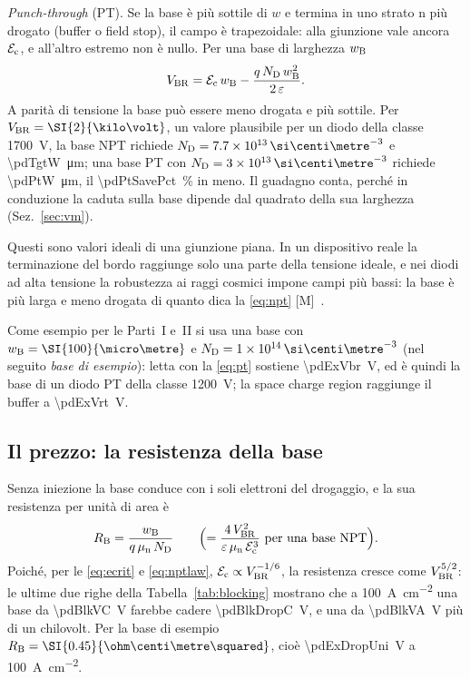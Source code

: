 \documentclass[10pt,a4paper]{scrartcl}
\let\newcommand\pdvaluedefine
\newcommand{\Ec}{\mathcal{E}_\mathrm{c}}      %
\newcommand{\ND}{N_\mathrm{D}}
\newcommand{\wB}{w_\mathrm{B}}
\newcommand{\mun}{\mu_\mathrm{n}}
\newcommand{\Vbr}{V_\mathrm{BR}}
\newcommand{\cmc}{\si{\centi\metre^{-3}}}
\begin{document}
\emph{Punch-through} (PT). Se la base è più sottile di $w$ e termina in uno strato n più drogato (buffer o field stop), il campo è trapezoidale: alla giunzione vale ancora $\Ec$, e all'altro estremo non è nullo. Per una base di larghezza $\wB$
\begin{equation}
\Vbr = \Ec\,\wB - \frac{q\,\ND\,\wB^2}{2\,\varepsilon} .
\label{eq:pt}
\end{equation}
A parità di tensione la base può essere meno drogata e più sottile. Per $\Vbr = \SI{\pdTgtV}{\kilo\volt}$, un valore plausibile per un diodo della classe \SI{1700}{\volt}, la base NPT richiede $\ND = \pdTgtNd\,\cmc$ e \SI{\pdTgtW}{\micro\metre}; una base PT con $\ND = \pdPtNd\,\cmc$ richiede \SI{\pdPtW}{\micro\metre}, il \SI{\pdPtSavePct}{\percent} in meno. Il guadagno conta, perché in conduzione la caduta sulla base dipende dal quadrato della sua larghezza (Sez.~\ref{sec:vm}).

Questi sono valori ideali di una giunzione piana. In un dispositivo reale la terminazione del bordo raggiunge solo una parte della tensione ideale, e nei diodi ad alta tensione la robustezza ai raggi cosmici impone campi più bassi: la base è più larga e meno drogata di quanto dica la \eqref{eq:npt} [M]~\cite{lutz}.

Come esempio per le Parti~I e~II si usa una base con $\wB = \SI{\pdExW}{\micro\metre}$ e $\ND = \pdExNd\,\cmc$ (nel seguito \emph{base di esempio}): letta con la \eqref{eq:pt} sostiene \SI{\pdExVbr}{\volt}, ed è quindi la base di un diodo PT della classe \SI{1200}{\volt}; la space charge region raggiunge il buffer a \SI{\pdExVrt}{\volt}.

\subsection{Il prezzo: la resistenza della base}
\label{sec:unipolar}
Senza iniezione la base conduce con i soli elettroni del drogaggio, e la sua resistenza per unità di area è
\begin{equation}
R_\mathrm{B} = \frac{\wB}{q\,\mun\,\ND} \qquad \Bigl(= \frac{4\,\Vbr^2}{\varepsilon\,\mun\,\Ec^3} \ \text{per una base NPT}\Bigr) .
\label{eq:runi}
\end{equation}
Poiché, per le \eqref{eq:ecrit} e \eqref{eq:nptlaw}, $\Ec \propto \Vbr^{-1/6}$, la resistenza cresce come $\Vbr^{5/2}$: le ultime due righe della Tabella~\ref{tab:blocking} mostrano che a \SI{100}{\ampere\per\centi\metre\squared} una base da \SI{\pdBlkVC}{\volt} farebbe cadere \SI{\pdBlkDropC}{\volt}, e una da \SI{\pdBlkVA}{\volt} più di un chilovolt. Per la base di esempio $R_\mathrm{B} = \SI{\pdExRuni}{\ohm\centi\metre\squared}$, cioè \SI{\pdExDropUni}{\volt} a \SI{100}{\ampere\per\centi\metre\squared}.
\end{document}
